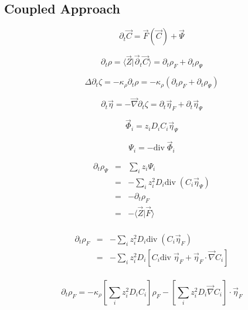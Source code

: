\documentclass[aps,12pt]{revtex4}
\begin{document}
\subsection{Coupled Approach}

\begin{equation}
	\partial_t \vec C = \vec F ( \vec C ) + \vec \Psi
\end{equation}

\begin{equation}
	\partial_t \rho = \langle \vec Z \vert \vec \partial_t \vec C \rangle = \partial_t \rho_F + \partial_t \rho_\Psi
\end{equation}

\begin{equation}
	\Delta \partial_t \zeta = -\kappa_\rho \partial_t \rho = -\kappa_\rho ( \partial_t \rho_F + \partial_t \rho_\Psi)
\end{equation}

\begin{equation}
	\partial_t \vec \eta = - \vec\nabla \partial_t \zeta = \partial_t \vec\eta_F + \partial_t \vec\eta_\Psi
\end{equation}

\begin{equation}
	\vec \Phi_i = z_i D_i C_i \vec\eta_\Psi
\end{equation}

\begin{equation}
	\Psi_i = - \mathrm{div}\; \vec \Phi_i 
\end{equation}

\begin{equation}
\begin{array}{rcl}
	\partial_t \rho_\Psi & = & \sum_i z_i \Psi_i \\
	& = &  - \sum_i z_i^2 D_i \mathrm{div}\;(C_i \vec \eta_\Psi)\\
	& = &  - \partial_t \rho_F\\
	& = &  - \langle \vec Z \vert \vec F \rangle \\
\end{array}
\end{equation}

\begin{equation}
\begin{array}{rcl}
\partial_t \rho_F & = & - \sum_i z_i^2 D_i \mathrm{div}\;(C_i \vec \eta_F)\\
 & = & - \sum_i z_i^2 D_i \left[ C_i \mathrm{div}\;  \vec \eta_F + \vec \eta_F \cdot \vec \nabla C_i \right]\\
 \end{array}
\end{equation}

\begin{equation}
\partial_t \rho_F  = - \kappa_\rho \left[\sum_i z_i^2 D_i C_i\right] \rho_F - 
\left[\sum_i z_i^2 D_i \vec \nabla C_i \right] \cdot \vec \eta_F
\end{equation}
\end{document}
